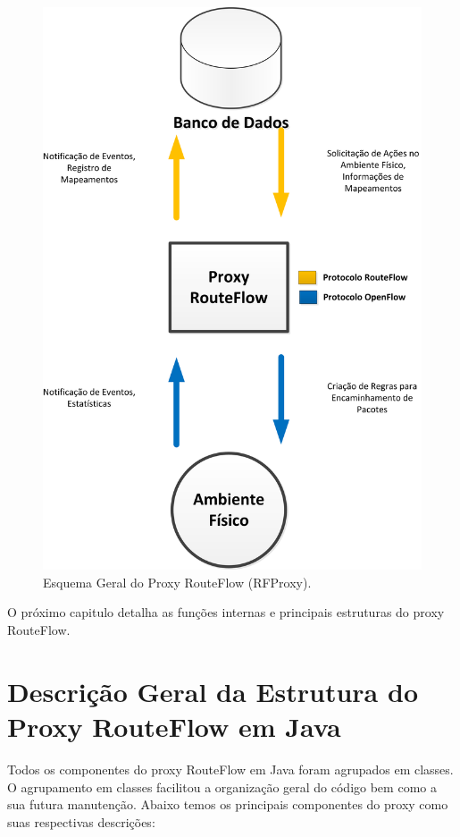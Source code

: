 \begin{figure}[h] 
\centering
\includegraphics[width=120mm]{esquematico_geral_proxy.png}
\caption{Esquema Geral do Proxy RouteFlow (RFProxy).}
\label{fig:esquematicoProxy} 
\end{figure}
 

O próximo capitulo detalha as funções internas e principais
estruturas do proxy RouteFlow.

\section{Descrição Geral da Estrutura do Proxy RouteFlow em Java}

Todos os componentes do proxy RouteFlow em Java foram agrupados em classes.
O agrupamento em classes facilitou a 
organização geral do código bem como a sua futura manutenção. 
Abaixo temos os principais componentes do proxy como 
suas respectivas descrições:

